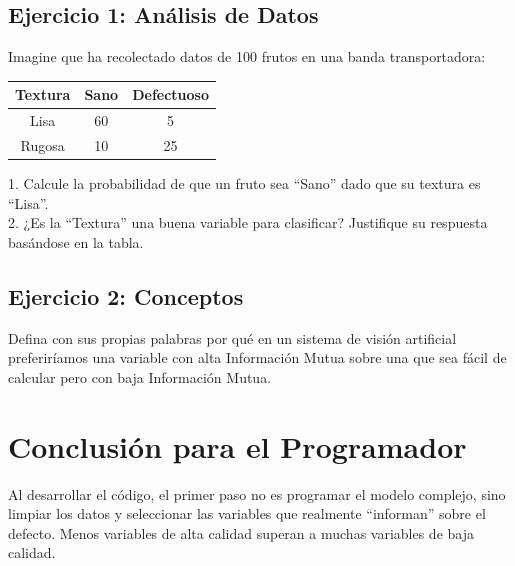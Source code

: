 \documentclass{article}
\begin{document}
\subsection{Ejercicio 1: Análisis de Datos}
Imagine que ha recolectado datos de 100 frutos en una banda transportadora:

\begin{center}
\begin{tabular}{|c|c|c|}
\hline
\textbf{Textura} & \textbf{Sano} & \textbf{Defectuoso} \\ \hline
Lisa & 60 & 5 \\ \hline
Rugosa & 10 & 25 \\ \hline
\end{tabular}
\end{center}

1. Calcule la probabilidad de que un fruto sea ``Sano'' dado que su textura es ``Lisa''. \\
2. ¿Es la ``Textura'' una buena variable para clasificar? Justifique su respuesta basándose en la tabla.

\subsection{Ejercicio 2: Conceptos}
Defina con sus propias palabras por qué en un sistema de visión artificial preferiríamos una variable con alta Información Mutua sobre una que sea fácil de calcular pero con baja Información Mutua.

\section{Conclusión para el Programador}
Al desarrollar el código, el primer paso no es programar el modelo complejo, sino limpiar los datos y seleccionar las variables que realmente ``informan'' sobre el defecto. Menos variables de alta calidad superan a muchas variables de baja calidad.
\end{document}
